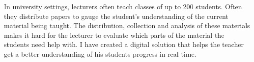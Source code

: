 In university settings, lecturers often teach classes of up to 200 students. Often they distribute papers to gauge the student’s understanding of the current material being taught. The distribution, collection and analysis of these materials makes it hard for the lecturer to evaluate which parts of the material the students need help with.
I have created a digital solution that helps the teacher get a better understanding of his students progress in real time.
